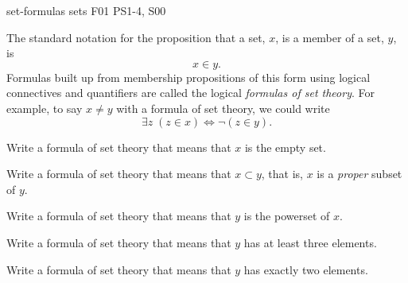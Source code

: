         \problemdata       %
        {set-formulas}             %
        {sets}  %
        {}               %
        {F01 PS1-4, S00} %
        {}        %

\begin{problem}
\begin{problemparts}

The standard notation for the proposition that a set, $x$, is a member of
a set, $y$, is
\[
x \in y.
\]
Formulas built up from membership propositions of this form using logical
connectives and quantifiers are called the logical \emph{formulas of set
theory}.  For example, to say $x \neq y$ with a formula of set theory, we
could write
\[
\exists z\; (z \in x) \iff \neg (z \in y).
\]

\problempart Write a formula of set theory that means that $x$ is the
empty set.

\problempart Write a formula of set theory that means that $x \subset y$, that
is, $x$ is a \emph{proper} subset of $y$.


\problempart Write a formula of set theory that means that $y$ is the powerset
of $x$.


\problempart Write a formula of set theory that means that $y$ has at least
three elements.


\problempart Write a formula of set theory that means that $y$ has exactly two
elements.


\end{problemparts}

\end{problem}